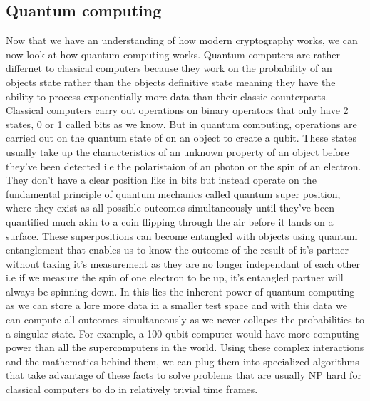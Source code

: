 \documentclass[10pt,a4paper]{article}
\begin{document}
\subsection{Quantum computing}
Now that we have an understanding of how modern cryptography works, we can now look at how quantum computing works. Quantum computers are rather differnet to classical computers because they work on the probability of an objects state rather than the objects definitive state meaning they have the ability to process exponentially more data than their classic counterparts.
\newline
Classical computers carry out operations on binary operators that only have 2 states, 0 or 1 called bits as we know. But in quantum computing, operations are carried out on the quantum state of on an object to create a qubit. These states usually take up the characteristics of an unknown property of an object before they've been detected i.e the polaristaion of an photon or the spin of an electron. They don't have a clear position like in bits but instead operate on the fundamental principle of quantum mechanics called quantum super position, where they exist as all possible outcomes simultaneously until they've been quantified much akin to a coin flipping through the air before it lands on a surface. 
\newline
These superpositions can become entangled with objects using quantum entanglement that enables us to know the outcome of the result of it's partner without taking it's measurement as they are no longer independant of each other i.e if we measure the spin of one electron to be up, it's entangled partner will always be spinning down. In this lies the inherent power of quantum computing as we can store a lore more data in a smaller test space and with this data we can compute all outcomes simultaneously as we never collapes the probabilities to a singular state. For example, a 100 qubit computer would have more computing power than all the supercomputers in the world.%
\newline
Using these complex interactions and the mathematics behind them, we can plug them into specialized algorithms that take advantage of these facts to solve problems that are usually NP hard for classical computers to do in relatively trivial time frames.
\end{document}
